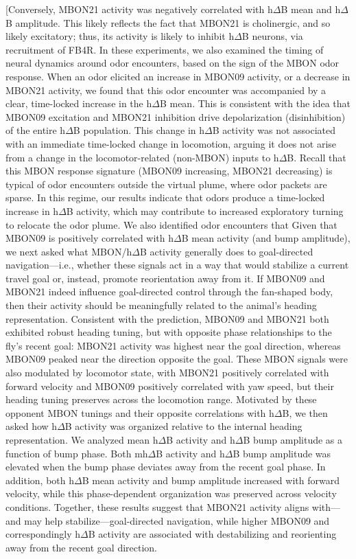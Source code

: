 [Conversely, MBON21 activity was negatively correlated with h$\Delta$B mean and h$\Delta$B amplitude. This likely reflects the fact that MBON21 is cholinergic, and so likely excitatory; thus, its activity is likely to inhibit h$\Delta$B neurons, via recruitment of FB4R.
In these experiments, we also examined the timing of neural dynamics around odor encounters, based on the sign of the MBON odor response. When an odor elicited an increase in MBON09 activity, or a decrease in MBON21 activity, we found that this odor encounter was accompanied by a clear, time-locked increase in the h$\Delta$B mean. This is consistent with the idea that MBON09 excitation and MBON21 inhibition drive depolarization (disinhibition) of the entire h$\Delta$B population. This change in h$\Delta$B activity was not associated with an immediate time-locked change in locomotion, arguing it does not arise from a change in the locomotor-related (non-MBON) inputs to h$\Delta$B. Recall that this MBON response signature (MBON09 increasing, MBON21 decreasing) is typical of odor encounters outside the virtual plume, where odor packets are sparse. In this regime, our results indicate that odors produce a time-locked increase in h$\Delta$B activity, which may contribute to increased exploratory turning to relocate the odor plume.
We also identified odor encounters that %
Given that MBON09 is positively correlated with h$\Delta$B mean activity (and bump amplitude), we next asked what MBON/h$\Delta$B activity generally does to goal-directed navigation—i.e., whether these signals act in a way that would stabilize a current travel goal or, instead, promote reorientation away from it. If MBON09 and MBON21 indeed influence goal-directed control through the fan-shaped body, then their activity should be meaningfully related to the animal’s heading representation. Consistent with the prediction, MBON09 and MBON21 both exhibited robust heading tuning, but with opposite phase relationships to the fly’s recent goal: MBON21 activity was highest near the goal direction, whereas MBON09 peaked near the direction opposite the goal. These MBON signals were also modulated by locomotor state, with MBON21 positively correlated with forward velocity and MBON09 positively correlated with yaw speed, but their heading tuning preserves across the locomotion range. 
Motivated by these opponent MBON tunings and their opposite correlations with h$\Delta$B, we then asked how h$\Delta$B activity was organized relative to the internal heading representation. We analyzed mean h$\Delta$B activity and h$\Delta$B bump amplitude as a function of bump phase. Both mh$\Delta$B activity and h$\Delta$B bump amplitude was elevated when the bump phase deviates away from the recent goal phase. In addition, both h$\Delta$B mean activity and bump amplitude increased with forward velocity, while this phase-dependent organization was preserved across velocity conditions. Together, these results suggest that MBON21 activity aligns with—and may help stabilize—goal-directed navigation, while higher MBON09 and correspondingly h$\Delta$B activity are associated with destabilizing and reorienting away from the recent goal direction.
